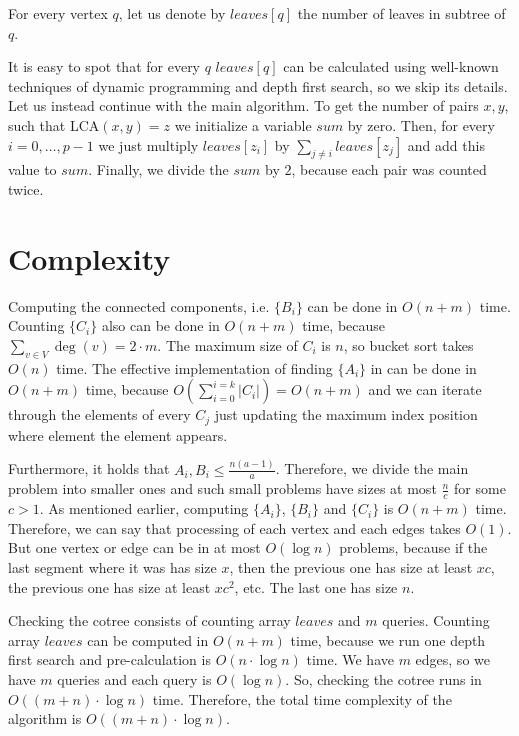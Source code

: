 \begin{definition}
    For every vertex $q$, let us denote by \emph{$leaves[q]$} the number of leaves in subtree of $q$.
\end{definition}

It is easy to spot that for every $q$ $leaves[q]$ can be calculated using well-known techniques of dynamic programming and depth first search, so we skip its details. Let us instead continue with the main algorithm. To get the number of pairs $x,y$, such that LCA$(x,y)=z$ we initialize a variable $sum$ by zero. Then, for every $i=0,\ldots,p-1$ we just multiply $leaves[z_i]$ by  $\sum_{j \neq i}^{}leaves[z_j]$ and add this value to $sum$. Finally, we divide the $sum$ by $2$, because each pair was counted twice.  
\section{Complexity}
Computing the connected components, i.e. $\{B_i\}$ can be done in $O(n+m)$ time. Counting $\{C_i\}$ also can be done in $O(n+m)$ time, because $\sum_{v \in V}^{} \deg(v) = 2 \cdot m$. The maximum size of $C_i$ is $n$, so bucket sort takes $O(n)$ time. The effective implementation of finding $\{A_i\}$ in  can be done in $O(n+m)$ time, because  $O(\sum_{i=0}^{i=k} |C_i|) = O(n+m)$ and we can iterate through the elements of every $C_j$ just updating the maximum index position where element the element appears.

Furthermore, it holds that $A_i, B_i \leq \frac{n(a-1)}{a}$. Therefore, we divide the main problem into smaller ones and such small problems have sizes at most $\frac{n}{c}$ for some $c > 1$. As mentioned earlier, computing $\{A_i\}$, $\{B_i\}$ and $\{C_i\}$ is $O(n+m)$ time. Therefore, we can say that processing of each vertex and each edges takes $O(1)$. But one vertex or edge can be in at most $O(\log{n})$ problems, because if the last segment where it was has size $x$, then the previous one has size at least $xc$, the previous one has size at least $xc^2$, etc. The last one has size $n$.

Checking the cotree consists of counting array $leaves$ and $m$ queries. Counting array $leaves$ can be computed in $O(n+m)$ time, because we run one depth first search and pre-calculation is $O(n \cdot \log{n})$ time. We have $m$ edges, so we have $m$ queries and each query is $O(\log{n})$. So, checking the cotree runs in $O((m + n) \cdot \log{n})$ time. Therefore, the total time complexity of the algorithm is $O((m + n) \cdot \log{n})$.
